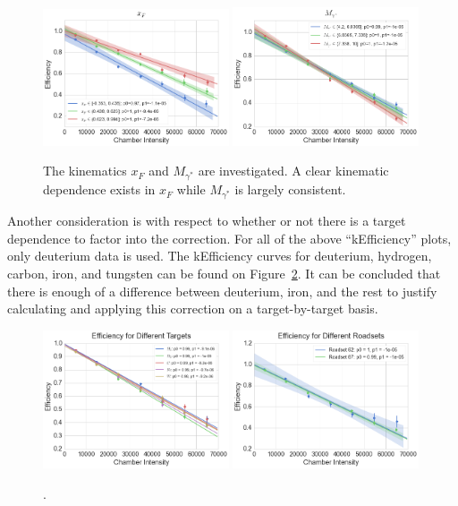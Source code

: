 \begin{figure}
	\centering
	\includegraphics[width=0.49\textwidth]{figures/analysis/xF-keff-int.png}
	\includegraphics[width=0.49\textwidth]{figures/analysis/mass-keff-int.png}
	\caption{The kinematics $x_F$ and $M_{\gamma^*}$ are investigated. A clear kinematic dependence exists in $x_F$ while $M_{\gamma^*}$ is largely consistent.}
	\label{fig:keff-mass-xf}
\end{figure}

Another consideration is with respect to whether or not there is a target dependence to factor into the correction. For all of the above ``kEfficiency'' plots, only deuterium data is used. The kEfficiency curves for deuterium, hydrogen, carbon, iron, and tungsten can be found on Figure~\ref{fig:keff-target-roadset}. It can be concluded that there is enough of a difference between deuterium, iron, and the rest to justify calculating and applying this correction on a target-by-target basis.
\begin{figure}
	\centering
	\includegraphics[width=0.49\textwidth]{figures/analysis/target-keff-int.png}
	\includegraphics[width=0.49\textwidth]{figures/analysis/roadset-keff-int.png}
	\caption{.}
	\label{fig:keff-target-roadset}
\end{figure}

